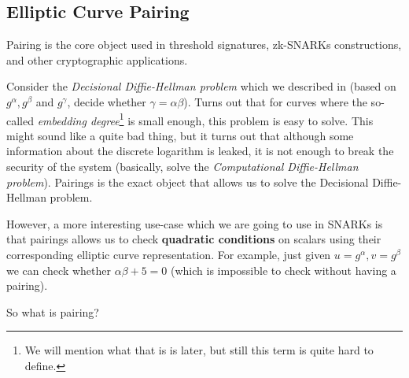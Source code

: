 \documentclass[../lecture-notes-148x210.tex]{subfiles}
\begin{document}
\vspace{-0.15mm}

\subsection{Elliptic Curve Pairing}\label{section:ecpairing}

\vspace{-0.15mm}

Pairing is the core object used in threshold signatures, zk-SNARKs
constructions, and other cryptographic applications. 

Consider the \textit{Decisional Diffie-Hellman problem} which we described in  
(based on $g^{\alpha},g^{\beta}$ and $g^{\gamma}$, decide whether $\gamma = \alpha\beta$). Turns out that for curves 
where the so-called \textit{embedding degree}\footnote{We will mention what that is is later, but still this term is 
quite hard to define.} is small enough, this problem is easy to solve. This might sound like a quite bad thing, but 
it turns out that although some information about the discrete logarithm is leaked, it is not enough to break the 
security of the system (basically, solve the \textit{Computational Diffie-Hellman problem}). Pairings is the exact 
object that allows us to solve the Decisional Diffie-Hellman problem.

However, a more interesting use-case which we are going to use in SNARKs is that pairings allows us to check 
\textbf{quadratic conditions} on scalars using their corresponding elliptic curve representation. For example, 
just given $u=g^{\alpha},v=g^{\beta}$ we can check whether $\alpha\beta+5=0$ (which is impossible to check without 
having a pairing). 

So what is pairing?
\end{document}
